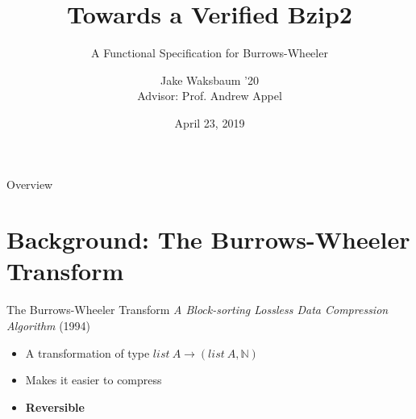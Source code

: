 \documentclass{beamer}
\title{Towards a Verified Bzip2}
\subtitle{A Functional Specification for Burrows-Wheeler}
\date{April 23, 2019}
\author{Jake Waksbaum '20\\Advisor: Prof. Andrew Appel}
\institute{Princeton University}
\begin{document}
  \maketitle

  \begin{frame}{Overview}
    \tableofcontents
  \end{frame}

  \section{Background: The Burrows-Wheeler Transform}

  \begin{frame}{The Burrows-Wheeler Transform}
    \textit{A Block-sorting Lossless Data Compression Algorithm} (1994)
    \begin{itemize}
    \item<+-> A transformation of type $list~A \to (list~A, \mathbb{N})$
    \item<+-> Makes it easier to compress
    \item<+-> \textbf{Reversible}
    \end{itemize}
  \end{frame}
\end{document}
